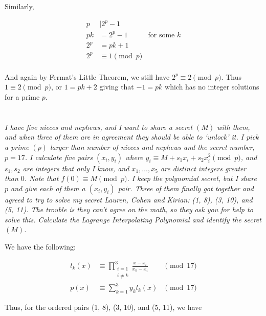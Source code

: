 \documentclass[12pt]{article}
\begin{document}
        Similarly,

        \begin{align*}
            p &\mid 2^p - 1\\
            pk &= 2^p - 1 &\text{for some $k$}\\
            2^p &= pk + 1\\
            2^p &\equiv 1 \pmod{p}\\
        \end{align*}

        And again by Fermat's Little Theorem, we still have $2^p \equiv 2 \pmod{p}$. Thus $1 \equiv 2 \pmod{p}$, or $1 = pk + 2$ giving that $-1 = pk$ which has no integer solutions for a prime $p$.

\newpage

\section{} \textit{I have five nieces and nephews, and I want to share a secret $(M)$ with them, and when three of them are in agreement they should be able to `unlock' it. I pick a prime $(p)$ larger than number of nieces and nephews and the secret number, $p = 17$. I calculate five pairs $(x_i, y_i)$ where $y_i \equiv M + s_1 x_i + s_2 x_i ^ 2\pmod{p}$, and $s_1, s_2$ are integers that only I know, and $x_1, \dots, x_5$ are distinct integers greater than $0$. Note that $f(0) \equiv M \pmod{p}$. I keep the polynomial secret, but I share $p$ and give each of them a $(x_i, y_i)$ pair. Three of them finally got together and agreed to try to solve my secret Lauren, Cohen and Kirian: (1, 8), (3, 10), and (5, 11). The trouble is they can't agree on the math, so they ask you for help to solve this. Calculate the Lagrange Interpolating Polynomial and identify the secret $(M)$.}

    We have the following:

    \begin{align*}
        l_k(x) &\equiv \prod_{\substack{i = 1 \\ i \neq k}}^3 \frac{x - x_i}{x_k - x_i} &\pmod{17}\\
        p(x) &\equiv \sum_{k = 1}^3 y_k l_k(x) &\pmod{17}
    \end{align*}

    Thus, for the ordered pairs (1, 8), (3, 10), and (5, 11), we have
\end{document}
